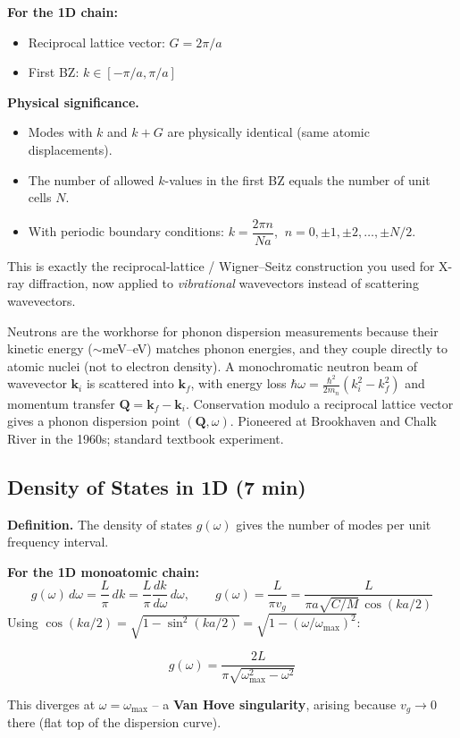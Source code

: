 \documentclass[11pt,a4paper]{article}
\begin{document}
\textbf{For the 1D chain:}
\begin{itemize}
\item Reciprocal lattice vector: $G = 2\pi/a$
\item First BZ: $k \in [-\pi/a,\pi/a]$
\end{itemize}

\textbf{Physical significance.}
\begin{itemize}
\item Modes with $k$ and $k+G$ are physically identical (same atomic displacements).
\item The number of allowed $k$-values in the first BZ equals the number of unit cells $N$.
\item With periodic boundary conditions: $k = \dfrac{2\pi n}{Na}$, $\ n=0,\pm1,\pm2,\dots,\pm N/2$.
\end{itemize}

\begin{physbox}
This is exactly the reciprocal-lattice / Wigner--Seitz construction you used for
X-ray diffraction, now applied to \emph{vibrational} wavevectors instead of
scattering wavevectors.
\end{physbox}

\begin{expbox}
Neutrons are the workhorse for phonon dispersion measurements because their
kinetic energy ($\sim$meV--eV) matches phonon energies, and they couple directly
to atomic nuclei (not to electron density). A monochromatic neutron beam of
wavevector $\mathbf k_i$ is scattered into $\mathbf k_f$, with energy loss
$\hbar\omega = \tfrac{\hbar^2}{2m_n}(k_i^2-k_f^2)$ and momentum transfer
$\mathbf Q = \mathbf k_f-\mathbf k_i$. Conservation modulo a reciprocal lattice
vector gives a phonon dispersion point $(\mathbf Q,\omega)$. Pioneered at
Brookhaven and Chalk River in the 1960s; standard textbook experiment.
\end{expbox}

\subsection{Density of States in 1D \hfill \small(7 min)}

\textbf{Definition.} The density of states $g(\omega)$ gives the number of modes per
unit frequency interval.

\textbf{For the 1D monoatomic chain:}
\[
g(\omega)\,d\omega = \frac{L}{\pi}\,dk = \frac{L}{\pi}\frac{dk}{d\omega}\,d\omega,
\qquad
g(\omega) = \frac{L}{\pi v_g} = \frac{L}{\pi a\sqrt{C/M}\,\cos(ka/2)}
\]
Using $\cos(ka/2)=\sqrt{1-\sin^2(ka/2)}=\sqrt{1-(\omega/\omega_{\max})^2}$:
\begin{keybox}
\[
g(\omega) = \frac{2L}{\pi\sqrt{\omega_{\max}^2-\omega^2}}
\]
\end{keybox}
This diverges at $\omega=\omega_{\max}$ -- a \textbf{Van Hove singularity}, arising
because $v_g\to0$ there (flat top of the dispersion curve).
\end{document}
